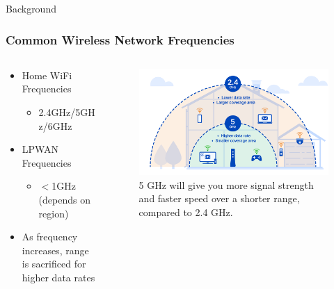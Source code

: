 \documentclass{beamer}
\begin{document}
\begin{frame}{Background}
  \frametitle{Common Wireless Network Frequencies}
  \begin{columns}
    \begin{column}{0.5\textwidth}
      \begin{itemize}
        \item Home WiFi Frequencies
          \begin{itemize}
            \item 2.4GHz/5GHz/6GHz
          \end{itemize}
        \item LPWAN Frequencies
          \begin{itemize}
            \item $<$1GHz (depends on region)
          \end{itemize}
        \item As frequency increases, range is sacrificed for higher data rates
      \end{itemize}
    \end{column}
    \begin{column}{0.5\textwidth}
      \begin{figure}[htbp]
        \centering
        \includegraphics[width=\textwidth]{FreguencyHouse.png}
        \caption{5 GHz will give you more signal strength and faster speed over a shorter range, 
        compared to 2.4 GHz.\cite{CenturyLink}}
        \label{fig:FrequencyHouse}
      \end{figure}
  \end{column}
  \end{columns}
\end{frame}
\end{document}

